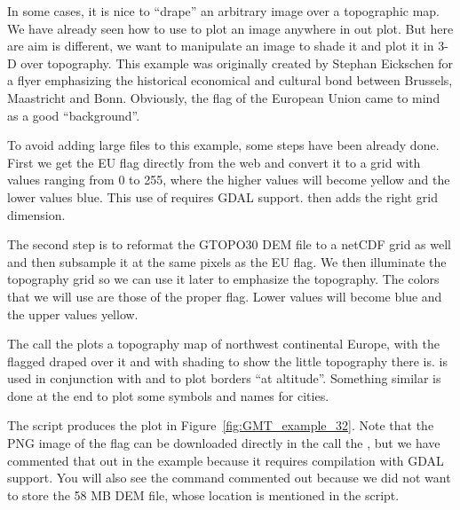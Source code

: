 In some cases, it is nice to ``drape'' an arbitrary image over a topographic map.
We have already seen how to use  to plot an image anywhere in out plot.
But here are aim is different, we want to manipulate an image to shade it and plot it in 3-D over topography.
This example was originally created by Stephan Eickschen for a flyer emphasizing the historical economical and cultural
bond between Brussels, Maastricht and Bonn. Obviously, the flag of the European Union came to mind as a good
``background''.

To avoid adding large files to this example, some steps have been already done. First we get the EU flag
directly from the web and convert it to a grid with values ranging from 0 to 255, where the higher values will become
yellow and the lower values blue. This use of  requires GDAL support.  then adds
the right grid dimension.

The second step is to reformat the GTOPO30 DEM file to a netCDF grid as well and then subsample it at the same pixels
as the EU flag. We then illuminate the topography grid so we can use it later to emphasize the topography.
The colors that we will use are those of the proper flag. Lower values will become blue and the upper values yellow.

The call the  plots a topography map of northwest continental Europe, with the flagged draped over
it and with shading to show the little topography there is.
 is used in conjunction with  and  to plot borders ``at altitude''.
Something similar is done at the end to plot some symbols and names for cities.


The script produces the plot in Figure~\ref{fig:GMT_example_32}. Note that the PNG image of the flag can be
downloaded directly in the call the , but we have commented that out in the example because
it requires compilation with GDAL support. You will also see the  command commented out because
we did not want to store the 58 MB DEM file, whose location is mentioned in the script.


